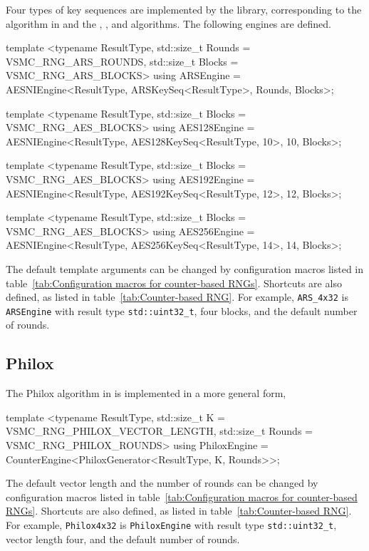 Four types of key sequences are implemented by the library, corresponding to
the \ars algorithm in \textcite{Salmon:2011um} and the , , and
 algorithms. The following \rng engines are defined.
\begin{cppcode}
  template <typename ResultType, std::size_t Rounds = VSMC_RNG_ARS_ROUNDS,
      std::size_t Blocks = VSMC_RNG_ARS_BLOCKS>
  using ARSEngine =
      AESNIEngine<ResultType, ARSKeySeq<ResultType>, Rounds, Blocks>;

  template <typename ResultType, std::size_t Blocks = VSMC_RNG_AES_BLOCKS>
  using AES128Engine =
      AESNIEngine<ResultType, AES128KeySeq<ResultType, 10>, 10, Blocks>;

  template <typename ResultType, std::size_t Blocks = VSMC_RNG_AES_BLOCKS>
  using AES192Engine =
      AESNIEngine<ResultType, AES192KeySeq<ResultType, 12>, 12, Blocks>;

  template <typename ResultType, std::size_t Blocks = VSMC_RNG_AES_BLOCKS>
  using AES256Engine =
      AESNIEngine<ResultType, AES256KeySeq<ResultType, 14>, 14, Blocks>;
\end{cppcode}
The default template arguments can be changed by configuration macros listed in
table~\ref{tab:Configuration macros for counter-based RNGs}. Shortcuts are also
defined, as listed in table~\ref{tab:Counter-based RNG}. For example,
\verb|ARS_4x32| is \verb|ARSEngine| with result type \verb|std::uint32_t|, four
blocks, and the default number of rounds.

\subsection{Philox}
\label{sub:Philox}

The Philox algorithm in \textcite{Salmon:2011um} is implemented in a more
general form,
\begin{cppcode}
  template <typename ResultType, std::size_t K = VSMC_RNG_PHILOX_VECTOR_LENGTH,
      std::size_t Rounds = VSMC_RNG_PHILOX_ROUNDS>
  using PhiloxEngine = CounterEngine<PhiloxGenerator<ResultType, K, Rounds>>;
\end{cppcode}
The default vector length and the number of rounds can be changed by
configuration macros listed in table~\ref{tab:Configuration macros for
  counter-based RNGs}. Shortcuts are also defined, as listed in
table~\ref{tab:Counter-based RNG}. For example, \verb|Philox4x32| is
\verb|PhiloxEngine| with result type \verb|std::uint32_t|, vector length four,
and the default number of rounds.

